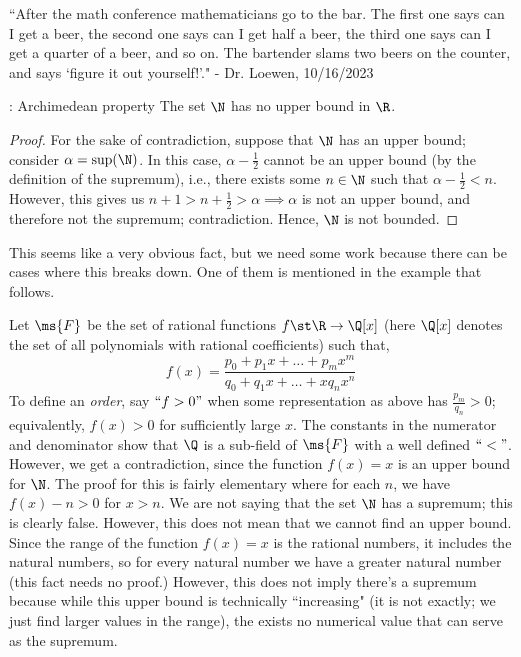 \begin{nquote}{}
	``After the math conference mathematicians go to the bar. The first one says can I get a beer, the second one says can I get half a beer, the third one says can I get a quarter of a beer, and so on. The bartender slams two beers on the counter, and says `figure it out yourself!'." - Dr. Loewen, 10/16/2023
\end{nquote}

\begin{ntheorem}{: Archimedean property}
	The set \(\N\) has no upper bound in \(\R\).
\end{ntheorem}
\begin{proof}
	For the sake of contradiction, suppose that \(\N\) has an upper bound; consider \(\alpha=\sup(\N)\). In this case, \(\alpha-\displaystyle\frac{1}{2}\) cannot be an upper bound (by the definition of the supremum), i.e., there exists some \(n\in\N\) such that \(\alpha-\displaystyle\frac{1}{2}<n\). However, this gives us \(n+1>n+\displaystyle\frac{1}{2}>\alpha\implies\alpha\) is not an upper bound, and therefore not the supremum; contradiction. Hence, \(\N\) is not bounded. 
\end{proof}
\begin{note}
	This seems like a very obvious fact, but we need some work because there can be cases where this breaks down. One of them is mentioned in the example that follows.
\end{note}
\begin{example}
	Let \(\ms{F}\) be the set of rational functions \(f\st\R\to\Q[x]\) (here \(\Q[x]\) denotes the set of all polynomials with rational coefficients) such that,
	\begin{equation*}
		f(x)=\frac{p_0+p_1x+\dots+p_mx^m}{q_0+q_1x+\dots+xq_nx^n}
	\end{equation*} 
	To define an \emph{order}, say \(``f>0"\) when some representation as above has \(\displaystyle\frac{p_m}{q_n}>0\); equivalently, \(f(x)>0\) for sufficiently large \(x\). The constants in the numerator and denominator show that \(\Q\) is a sub-field of \(\ms{F}\) with a well defined \(``<"\). However, we get a contradiction, since the function \(f(x)=x\) is an upper bound for \(\N\). The proof for this is fairly elementary where for each \(n\), we have \(f(x)-n>0\) for \(x>n\). We are not saying that the set \(\N\) has a supremum; this is clearly false. However, this does not mean that we cannot find an upper bound. Since the range of the function \(f(x)=x\) is the rational numbers, it includes the natural numbers, so for every natural number we have a greater natural number (this fact needs no proof.) However, this does not imply there's a supremum because while this upper bound is technically ``increasing" (it is not exactly; we just find larger values in the range), the exists no numerical value that can serve as the supremum.
\end{example}

